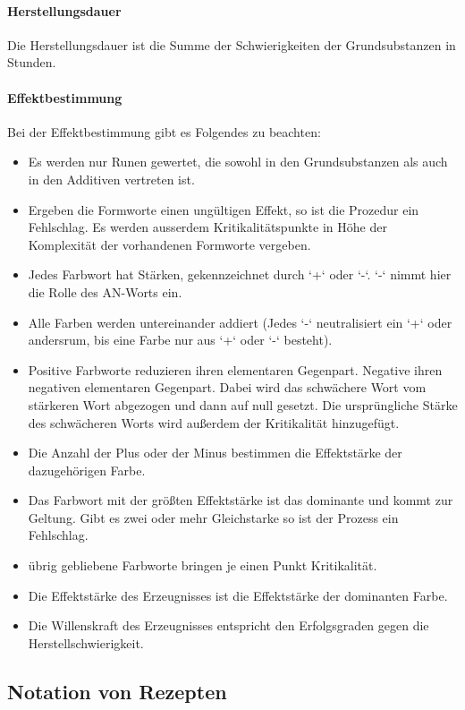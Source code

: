 \documentclass{article}
\begin{document}
\paragraph{Herstellungsdauer}

Die Herstellungsdauer ist die Summe der Schwierigkeiten der Grundsubstanzen in Stunden.

\paragraph{Effektbestimmung}

Bei der Effektbestimmung gibt es Folgendes zu beachten:

\begin{itemize}
\item Es werden nur Runen gewertet, die sowohl in den Grundsubstanzen als auch in den Additiven vertreten ist.
\item Ergeben die Formworte einen ungültigen Effekt, so ist die Prozedur ein Fehlschlag. Es werden ausserdem Kritikalitätspunkte in Höhe der Komplexität der vorhandenen Formworte vergeben.
\item Jedes Farbwort hat Stärken, gekennzeichnet durch `+` oder `-`. `-` nimmt hier die Rolle des AN-Worts ein.
\item Alle Farben werden untereinander addiert (Jedes `-` neutralisiert ein `+` oder andersrum, bis eine Farbe nur aus `+` oder  `-` besteht).
\item Positive Farbworte reduzieren ihren elementaren Gegenpart. Negative ihren negativen elementaren Gegenpart. Dabei wird das schwächere Wort vom stärkeren Wort abgezogen und dann auf null gesetzt. Die ursprüngliche Stärke des schwächeren Worts wird außerdem der Kritikalität hinzugefügt.
\item Die Anzahl der Plus oder der Minus bestimmen die Effektstärke der dazugehörigen Farbe.
\item Das Farbwort mit der größten Effektstärke ist das dominante und kommt zur Geltung. Gibt es zwei oder mehr Gleichstarke so ist der Prozess ein Fehlschlag.
\item übrig gebliebene Farbworte bringen je einen Punkt Kritikalität.
\item Die Effektstärke des Erzeugnisses ist die Effektstärke der dominanten Farbe.
\item Die Willenskraft des Erzeugnisses entspricht den Erfolgsgraden gegen die Herstellschwierigkeit.
\end{itemize}

\begin{center}
\subsection{Notation von Rezepten}
\end{center}
\end{document}
